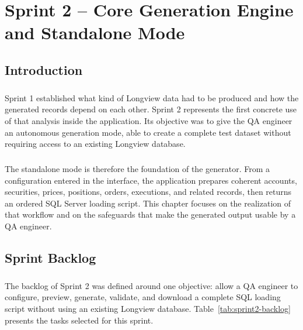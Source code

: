 \chapter{Sprint 2 -- Core Generation Engine and Standalone Mode}

\setlength{\textfloatsep}{8pt plus 2pt minus 2pt}
\setlength{\floatsep}{8pt plus 2pt minus 2pt}
\setlength{\intextsep}{8pt plus 2pt minus 2pt}
\setlength{\abovecaptionskip}{4pt}
\setlength{\belowcaptionskip}{0pt}

\section*{Introduction}

\paragraph{}Sprint 1 established what kind of Longview data had to be produced and how the generated
records depend on each other. Sprint 2 represents the first concrete use of that analysis inside the
application. Its objective was to give the QA engineer an autonomous generation mode, able to create
a complete test dataset without requiring access to an existing Longview database.

\paragraph{}The standalone mode is therefore the foundation of the generator. From a configuration
entered in the interface, the application prepares coherent accounts, securities, prices, positions,
orders, executions, and related records, then returns an ordered SQL Server loading script. This
chapter focuses on the realization of that workflow and on the safeguards that make the generated
output usable by a QA engineer.

\section{Sprint Backlog}

\paragraph{}The backlog of Sprint 2 was defined around one objective: allow a QA engineer to configure,
preview, generate, validate, and download a complete SQL loading script without using an existing
Longview database. Table~\ref{tab:sprint2-backlog} presents the tasks selected for this sprint.

